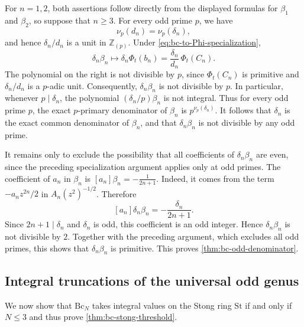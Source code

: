 \documentclass[14pt,dvipsnames]{extarticle}
\makeatletter
\numberwithin{equation}{subsection}
\theoremstyle{plain}
\theoremstyle{definition}
\theoremstyle{definition}
\renewenvironment{proof}[1][\proofname]{
 \par\pushQED{\qed}\normalfont
 \topsep6\p@\@plus6\p@\relax
 \trivlist\item[\hskip\labelsep\bfseries\itshape #1\@addpunct{.}]
}{\popQED\endtrivlist\@endpefalse}
\newcommand{\Bc}{\mathrm{Bc}}
\newcommand{\St}{\mathrm{St}}
\makeatother
\begin{document}
\begin{proof}[Proof of \cref{thm:bc-odd-denominator}]
For $n=1,2$, both assertions follow directly from the displayed formulas
for $\beta_1$ and $\beta_2$, so suppose that $n\geq3$. For every odd prime
$p$, we have
\[
 \nu_p(d_n)=\nu_p(\delta_n),
\]
and hence $\delta_n/d_n$ is a unit in $\mathbb Z_{(p)}$. Under
\eqref{eq:bc-to-Phi-specialization},
\[
 \delta_n\beta_n\longmapsto
 \delta_n\Phi_t(b_n)=\frac{\delta_n}{d_n}\,\Phi_t(C_n).
\]
The polynomial on the right is not divisible by $p$, since $\Phi_t(C_n)$
is primitive and $\delta_n/d_n$ is a $p$-adic unit. Consequently,
$\delta_n\beta_n$ is not divisible by $p$. In particular, whenever
$p\mid\delta_n$, the polynomial $(\delta_n/p)\beta_n$ is not integral.
Thus for every odd prime $p$, the exact $p$-primary denominator of
$\beta_n$ is $p^{\nu_p(\delta_n)}$. It follows that $\delta_n$ is the exact
common denominator of $\beta_n$, and that $\delta_n\beta_n$ is not divisible
by any odd prime.

It remains only to exclude the possibility that all coefficients of \(\delta_n\beta_n\) are even, since the preceding specialization argument applies only at odd primes. The coefficient of \(a_n\) in \(\beta_n\) is \([a_n]\beta_n=-\frac{1}{2n+1}\).
Indeed, it comes from the term \(-a_nz^{2n}/2\) in \(A_n(z^2)^{-1/2}\). Therefore
\[
[a_n]\delta_n\beta_n = -\frac{\delta_n}{2n+1}.
\]
Since \(2n+1\mid\delta_n\) and \(\delta_n\) is odd, this coefficient is an odd integer. Hence \(\delta_n\beta_n\) is not divisible by \(2\). Together with the preceding argument, which excludes all odd primes, this shows that \(\delta_n\beta_n\) is primitive. This proves \cref{thm:bc-odd-denominator}.
\end{proof}











\subsection{Integral truncations of the universal odd genus}
\label{sec:integral-truncations}

We now show that $\Bc_{N}$ takes integral values on the Stong ring $\St$ if and only if $N \leq 3$ and thus prove \cref{thm:bc-stong-threshold}.
\end{document}
